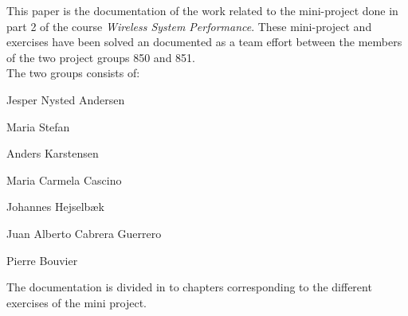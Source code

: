 This paper is the documentation of the work related to the mini-project done in part 2 of the course \textit{Wireless System Performance}. These mini-project and exercises have been solved an documented as a team effort between the members of the two project groups 850 and 851.\\

The two groups consists of:
	\begin{description}
	\item \hspace{4cm} Jesper Nysted Andersen
 	\item \hspace{4cm} Maria Stefan
 	\item \hspace{4cm} Anders Karstensen
 	\item \hspace{4cm} Maria Carmela Cascino
 	\item \hspace{4cm} Johannes Hejselbæk
 	\item \hspace{4cm} Juan Alberto Cabrera Guerrero
 	\item \hspace{4cm} Pierre Bouvier
	\end{description}

\vspace{2cm}
The documentation is divided in to chapters corresponding to the different exercises of the mini project.  